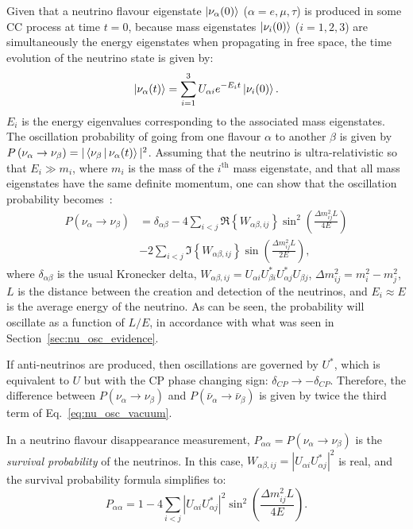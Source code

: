 Given that a neutrino flavour eigenstate $\Ket{\nu_{\alpha}(0)}$ ($\alpha=e,\mu,\tau$) is produced in some CC process at time $t = 0$, because mass eigenstates $\Ket{\nu_{i}(0)}$ ($i=1,2,3$) are simultaneously the energy eigenstates when propagating in free space, the time evolution of the neutrino state is given by:
\begin{equation}
    \Ket{\nu_{\alpha}(t)} = \sum_{i=1}^{3}U_{\alpha i}e^{-E_{i}t}\Ket{\nu_{i}(0)}.
\end{equation}
$E_{i}$ is the energy eigenvalues corresponding to the associated mass eigenstates. The oscillation probability of going from one flavour $\alpha$ to another $\beta$ is given by $P\left(\nu_{\alpha}\to\nu_{\beta}\right) = |\Braket{\nu_{\beta} | \nu_{\alpha}(t)}|^{2}$. Assuming that the neutrino is ultra-relativistic so that $E_{i}\gg m_{i}$, where $m_{i}$ is the mass of the $i^{\mathrm{th}}$ mass eigenstate, and that all mass eigenstates have the same definite momentum, one can show that the oscillation probability becomes~\cite{deppischChapterNeutrinoOscillations2019}: %
\begin{align}\label{eq:nu_osc_vacuum}
    P\left(\nu_{\alpha}\to\nu_{\beta}\right) &=
        \delta_{\alpha\beta} 
        - 4\sum_{i<j}\Re\left\{W_{\alpha\beta,ij}\right\}\sin^{2}\left(\frac{\Delta m^{2}_{ij}L}{4E}\right)\nonumber\\
        &- 2\sum_{i<j}\Im\left\{W_{\alpha\beta,ij}\right\}\sin\left(\frac{\Delta m^{2}_{ij}L}{2E}\right),
\end{align}
where $\delta_{\alpha\beta}$ is the usual Kronecker delta, $W_{\alpha\beta,ij}=U_{\alpha i}U_{\beta i}^{*}U_{\alpha j}^{*}U_{\beta j}$, $\Delta m^{2}_{ij}=m^{2}_{i} - m^{2}_{j}$, $L$ is the distance between the creation and detection of the neutrinos, and $E_{i}\approx E$ is the average energy of the neutrino. As can be seen, the probability will oscillate as a function of $L/E$, in accordance with what was seen in Section~\ref{sec:nu_osc_evidence}.

If anti-neutrinos are produced, then oscillations are governed by $U^{*}$, which is equivalent to $U$ but with the CP phase changing sign: $\delta_{CP}\to -\delta_{CP}$. Therefore, the difference between $P\left(\nu_{\alpha}\to\nu_{\beta}\right)$ and $P\left(\bar{\nu}_{\alpha}\to\bar{\nu}_{\beta}\right)$ is given by twice the third term of Eq.~\ref{eq:nu_osc_vacuum}.

In a neutrino flavour disappearance measurement, $P_{\alpha\alpha} = P\left(\nu_{\alpha}\to\nu_{\beta}\right)$ is the \textit{survival probability} of the neutrinos. In this case, $W_{\alpha\beta,ij} = |U_{\alpha i}U_{\alpha j}^{*}|^{2}$ is real, and the survival probability formula simplifies to:
\begin{equation}
    P_{\alpha\alpha} = 1 
    - 4\sum_{i<j}|U_{\alpha i}U_{\alpha j}^{*}|^{2}\sin^{2}\left(\frac{\Delta m^{2}_{ij}L}{4E}\right).
\end{equation}

